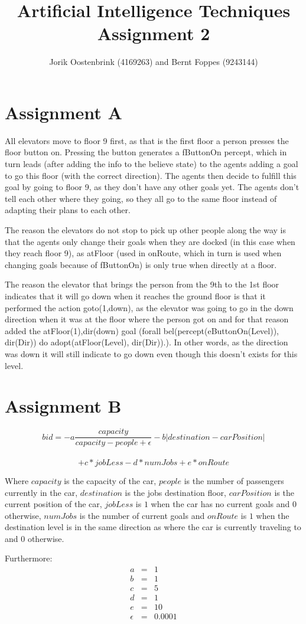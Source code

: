 \documentclass[a4paper,11pt]{article}
\title{Artificial Intelligence Techniques Assignment 2}
\author{Jorik Oostenbrink (4169263) and Bernt Foppes (9243144)}
\date{}
\begin{document}
\maketitle	

\section{Assignment A}
All elevators move to floor 9 first, as that is the first floor a person presses the floor button on. Pressing the button generates a fButtonOn percept, which in turn leads (after adding the info to the believe state) to the agents adding a goal to go this floor (with the correct direction). The agents then decide to fulfill this goal by going to floor 9, as they don't have any other goals yet. The agents don't tell each other where they going, so they all go to the same floor instead of adapting their plans to each other.

The reason the elevators do not stop to pick up other people along the way is that the agents only change their goals when they are docked (in this case when they reach floor 9), as atFloor (used in onRoute, which in turn is used when changing goals because of fButtonOn) is only true when directly at a floor.

The reason the elevator that brings the person from the 9th to the 1st floor indicates that it will go down when it reaches the ground floor is that it performed the action goto(1,down), as the elevator was going to go in the down direction when it was at the floor where the person got on and for that reason added the atFloor(1),dir(down) goal (forall bel(percept(eButtonOn(Level)), dir(Dir)) do adopt(atFloor(Level), dir(Dir)).). In other words, as the direction was down it will still indicate to go down even though this doesn't exists for this level.

\section{Assignment B}

\[bid = -a\frac{capacity}{capacity-people+\epsilon} - b|destination - carPosition|\]\\ \[+ c*jobLess - d*numJobs + e*onRoute\]

Where $capacity$ is the capacity of the car, $people$ is the number of passengers currently in the car, $destination$ is the jobs destination floor, $carPosition$ is the current position of the car, $jobLess$ is $1$ when the car has no current goals and $0$ otherwise, $numJobs$ is the number of current goals and $onRoute$ is $1$ when the destination level is in the same direction as where the car is currently traveling to and $0$ otherwise.

Furthermore: \[\begin{array}{lcl}
a & = & 1\\
b & = & 1\\
c & = & 5\\
d & = & 1\\
e & = & 10\\
\epsilon & = & 0.0001
\end{array}\]
\end{document}
